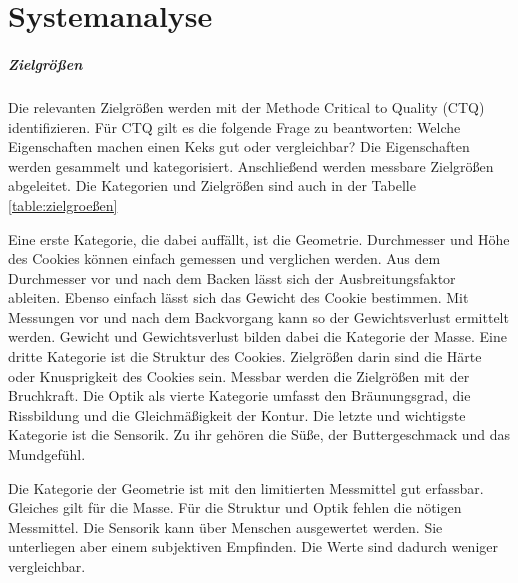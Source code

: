 \chapter{Systemanalyse}\label{ch:systemanalyse}

\paragraph{Zielgrößen}
Die relevanten Zielgrößen werden mit der Methode Critical to Quality (CTQ) \cite{wuM2024ctq} identifizieren.
Für CTQ gilt es die folgende Frage zu beantworten: 
Welche Eigenschaften machen einen Keks gut oder vergleichbar?
Die Eigenschaften werden gesammelt und kategorisiert.
Anschließend werden messbare Zielgrößen abgeleitet.
Die Kategorien und Zielgrößen sind auch in der Tabelle \ref{table:zielgroeßen}



Eine erste Kategorie, die dabei auffällt, ist die Geometrie.
Durchmesser und Höhe des Cookies können einfach gemessen und verglichen werden.
Aus dem Durchmesser vor und nach dem Backen lässt sich der Ausbreitungsfaktor ableiten.
Ebenso einfach lässt sich das Gewicht des Cookie bestimmen.
Mit Messungen vor und nach dem Backvorgang kann so der Gewichtsverlust ermittelt werden.
Gewicht und Gewichtsverlust bilden dabei die Kategorie der Masse.
Eine dritte Kategorie ist die Struktur des Cookies.
Zielgrößen darin sind die Härte oder Knusprigkeit des Cookies sein.
Messbar werden die Zielgrößen mit der Bruchkraft.
Die Optik als vierte Kategorie umfasst den Bräunungsgrad, die Rissbildung und die Gleichmäßigkeit der Kontur.
Die letzte und wichtigste Kategorie ist die Sensorik.
Zu ihr gehören die Süße, der Buttergeschmack und das Mundgefühl.

Die Kategorie der Geometrie ist mit den limitierten Messmittel gut erfassbar.
Gleiches gilt für die Masse. %
Für die Struktur und Optik fehlen die nötigen Messmittel.
Die Sensorik kann über Menschen ausgewertet werden.
Sie unterliegen aber einem subjektiven Empfinden.
Die Werte sind dadurch weniger vergleichbar.




